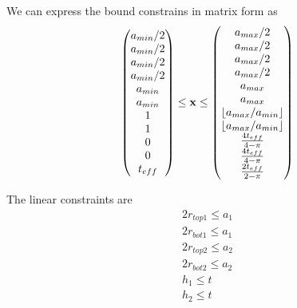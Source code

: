 \documentclass[12pt]{article}
\numberwithin{equation}{section}
\DeclarePairedDelimiter\floor{\lfloor}{\rfloor}
\numberwithin{equation}{section}
\begin{document}
\begin{outline}[enumerate]
We can express the bound constrains in matrix form as
\begin{equation}
\left(
\begin{matrix}
a_{min}/2\\ 
a_{min}/2\\ 
a_{min}/2\\ 
a_{min}/2\\
a_{min}\\ 
a_{min}\\ 
1 \\    %
1 \\
0 \\
0 \\
t_{eff} 
\end{matrix} \right )
\leq \mathbf{x}
 \leq 
 \left(
\begin{matrix}
a_{max}/2 \\ a_{max}/2 \\ a_{max}/2 \\ a_{max}/2 \\ a_{max} \\ a_{max} \\ \floor{a_{max}/a_{min}}  \\ \floor{a_{max}/a_{min}}  \\  \frac {4t_{eff}}{4- \pi}\\  \frac {4t_{eff}}{4- \pi}\\ \frac {2t_{eff}}{2- \pi}
\end{matrix} \right )
\end{equation}

The linear constraints are 
\begin{align*} 
2 r_{top1} \leq a_1 \\
2 r_{bot1} \leq a_1\\
2 r_{top2} \leq a_2\\
2 r_{bot2} \leq a_2 \\
h_1 \leq t \\
h_2 \leq t
\end{align*}


\end{outline}
\end{document}

